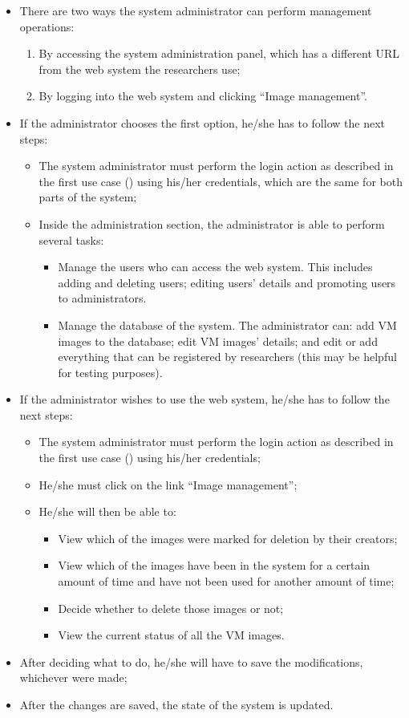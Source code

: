 \begin{itemize}
\item There are two ways the system administrator can perform management operations:
	\begin{enumerate}
	\item By accessing the system administration panel, which has a different URL from the web system the researchers use;
	\item By logging into the web system and clicking ``Image management''.
	\end{enumerate}
\item If the administrator chooses the first option, he/she has to follow the next steps:
	\begin{itemize}
		\item The system administrator must perform the login action as described in the first use case () using his/her credentials, which are the same for both parts of the system;
		\item Inside the administration section, the administrator is able to perform several tasks:
			\begin{itemize}
			\item Manage the users who can access the web system. This includes adding and deleting users; editing users' details and promoting users to administrators.
			\item Manage the database of the system. The administrator can: add VM images to the database; edit VM images' details; and edit or add everything that can be registered by researchers (this may be helpful for testing purposes).
			\end{itemize}
	\end{itemize}
\item If the administrator wishes to use the web system, he/she has to follow the next steps:
	\begin{itemize}
	\item The system administrator must perform the login action as described in the first use case () using his/her credentials;
	\item He/she must click on the link ``Image management'';
	\item He/she will then be able to:
		\begin{itemize}
		\item View which of the images were marked for deletion by their creators;
		\item View which of the images have been in the system for a certain amount of time and have not been used for another amount of time;
		\item Decide whether to delete those images or not;
		\item View the current status of all the VM images.
		\end{itemize}
	\end{itemize}
\item After deciding what to do, he/she will have to save the modifications, whichever were made;
\item After the changes are saved, the state of the system is updated.
\end{itemize}

